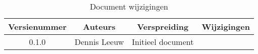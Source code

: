\begin{flushleft}
\begin{table}[h!]
\centering
\begin{tabularx}{\textwidth}{ |c|c|c|X| }
\hline
	Versienummer &
	Auteurs &
	Verspreiding &
	Wijzigingen\\
\hline
	0.1.0 &
	Dennis Leeuw &
	Initieel document\\
\hline
\hline
\end{tabularx}
\caption{Document wijzigingen}
\label{table:1}
\end{table}
\end{flushleft}

